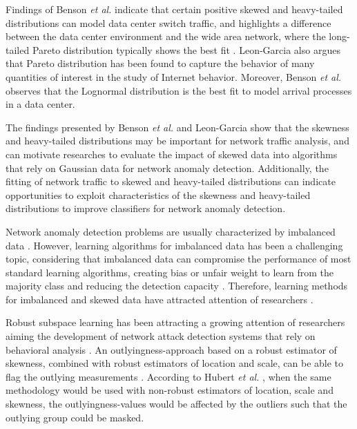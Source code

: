 \documentclass[review]{elsarticle}
\begin{document}
Findings of Benson \emph{et al.}  \cite{benson2010network} indicate that certain positive skewed and heavy-tailed distributions can model data center switch traffic, and highlights a difference between the data center environment and the wide area network, where the long-tailed Pareto distribution typically shows the best fit \cite{benson2010network}. Leon-Garcia \cite{leon2017probability} also argues that Pareto distribution has been found to capture the behavior of many quantities of interest in the study of Internet behavior. Moreover, Benson \emph{et al.}  \cite{benson2010network} observes that the Lognormal distribution is the best fit to model arrival processes in a data center.

The findings presented by Benson \emph{et al.} \cite{benson2010network} and Leon-Garcia \cite{leon2017probability} show that the skewness and heavy-tailed distributions may be important for network traffic analysis, and can motivate researches to evaluate the impact of skewed data into algorithms that rely on Gaussian data for network anomaly detection. Additionally, the fitting of network traffic to skewed and heavy-tailed distributions can indicate opportunities to exploit characteristics of the skewness and heavy-tailed distributions to improve classifiers for network anomaly detection.

Network anomaly detection problems are usually characterized by imbalanced data \cite{Phua2004minority}. However, learning algorithms for imbalanced data has been a challenging topic, considering that imbalanced data can compromise the performance of most standard learning algorithms, creating bias or unfair weight to learn from the majority class and reducing the detection capacity \cite{he2008learning}. Therefore, learning methods for imbalanced and skewed data have attracted attention of researchers \cite{hubert2009robustskewed}.

Robust subspace learning has been attracting a growing attention of researchers aiming the development of network attack detection systems that rely on behavioral analysis \cite{pascoal2012robust, zhou2017anomaly}. An outlyingness-approach based on a robust estimator of skewness, combined with robust estimators of location and scale, can be able to flag the outlying measurements \cite{hubert2009robustskewed}. According to Hubert \emph{et al.} \cite{hubert2009robustskewed}, when the same methodology would be used with non-robust estimators of location, scale and skewness, the outlyingness-values would be affected by the outliers such that the outlying group could be masked.
\end{document}
